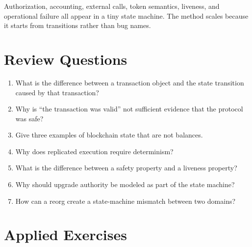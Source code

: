 Authorization, accounting, external calls, token semantics, liveness, and operational failure all appear in a tiny state machine. The method scales because it starts from transitions rather than bug names.

\section*{Review Questions}

\begin{enumerate}
\item What is the difference between a transaction object and the state transition caused by that transaction?
\item Why is ``the transaction was valid'' not sufficient evidence that the protocol was safe?
\item Give three examples of blockchain state that are not balances.
\item Why does replicated execution require determinism?
\item What is the difference between a safety property and a liveness property?
\item Why should upgrade authority be modeled as part of the state machine?
\item How can a reorg create a state-machine mismatch between two domains?
\end{enumerate}

\section*{Applied Exercises}

